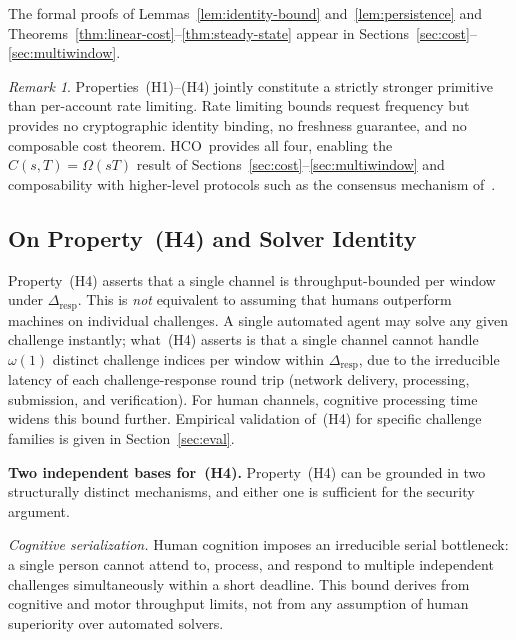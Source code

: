 \documentclass[11pt]{article}
\newcommand{\HCO}{HCO\xspace}
\theoremstyle{remark}
\newtheorem{remark}{Remark}
\theoremstyle{plain}
\begin{document}
	The formal proofs of Lemmas~\ref{lem:identity-bound}
	and~\ref{lem:persistence} and
	Theorems~\ref{thm:linear-cost}--\ref{thm:steady-state} appear
	in Sections~\ref{sec:cost}--\ref{sec:multiwindow}.
	
	
	\begin{remark}
		Properties~(H1)--(H4) jointly constitute a strictly stronger primitive
		than per-account rate limiting. Rate limiting bounds request frequency
		but provides no cryptographic identity binding, no freshness guarantee,
		and no composable cost theorem. \HCO\ provides all four, enabling the
		$C(s,T) = \Omega(sT)$ result of
		Sections~\ref{sec:cost}--\ref{sec:multiwindow} and composability with
		higher-level protocols such as the consensus mechanism
		of~\cite{maleki2026pocmt}.
	\end{remark}
	
	\subsection{On Property~(H4) and Solver Identity}
	
	Property~(H4) asserts that a single channel is throughput-bounded per
	window under $\Delta_{\mathrm{resp}}$. This is \emph{not} equivalent to
	assuming that humans outperform machines on individual challenges. A single
	automated agent may solve any given challenge instantly; what~(H4) asserts
	is that a single channel cannot handle $\omega(1)$ distinct challenge
	indices per window within $\Delta_{\mathrm{resp}}$, due to the irreducible
	latency of each challenge-response round trip (network delivery, processing,
	submission, and verification). For human channels, cognitive processing
	time widens this bound further. Empirical validation of~(H4) for specific
	challenge families is given in Section~\ref{sec:eval}.
	
	\noindent\textbf{Two independent bases for~(H4).}
	Property~(H4) can be grounded in two structurally distinct mechanisms,
	and either one is sufficient for the security argument.
	
	\emph{Cognitive serialization.}
	Human cognition imposes an irreducible serial bottleneck: a single person
	cannot attend to, process, and respond to multiple independent challenges
	simultaneously within a short deadline. This bound derives from cognitive
	and motor throughput limits, not from any assumption of human superiority
	over automated solvers.
	
\end{document}
